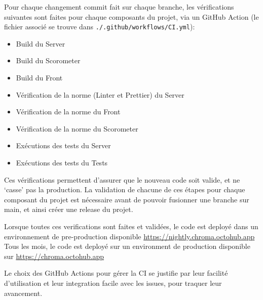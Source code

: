 Pour chaque changement commit fait sur chaque branche, les vérifications suivantes sont faites pour chaque composants du projet, via un GitHub Action (le fichier associé se trouve dans \verb|./.github/workflows/CI.yml|):

\begin{itemize}
	\item Build du Server
	\item Build du Scorometer
	\item Build du Front
	\item Vérification de la norme (Linter et Prettier) du Server
	\item Vérification de la norme du Front
	\item Vérification de la norme du Scorometer
	\item Exécutions des tests du Server
	\item Exécutions des tests du Tests
\end{itemize}


Ces vérifications permettent d’assurer que le nouveau code soit valide, et ne ‘casse’ pas la production.
La validation de chacune de ces étapes pour chaque composant du projet est nécessaire avant de pouvoir fusionner une branche sur main, et ainsi créer une release du projet.

Lorsque toutes ces verifications sont faites et validées, le code est deployé dans un environnement de pre-production disponible \url{https://nightly.chroma.octohub.app}
Tous les mois, le code est deployé sur un environment de production disponible sur \url{https://chroma.octohub.app}

Le choix des GitHub Actions pour gérer la CI se justifie par leur facilité d'utilisation et leur integration facile avec les issues, pour traquer leur avancement.
